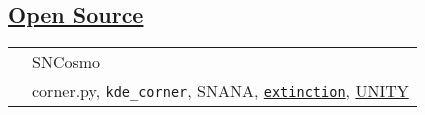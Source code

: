 \documentclass[margin]{res}
\begin{document}
\begin{resume}
\section{\href{https://github.com/benjaminrose}{Open Source}}



\begin{tabular}{l p{4.3in}}
\hspace{-0.6em}{\bf Co-maintainer:} & SNCosmo\\
\hspace{-0.6em}{\bf Source Code:} & 
corner.py, \texttt{kde\_corner}, SNANA, \href{https://github.com/conda-forge/extinction-feedstock}{\texttt{extinction}}, \href{https://github.com/rubind/host_unity}{UNITY}\\


\end{tabular}
\end{resume}
\end{document}
